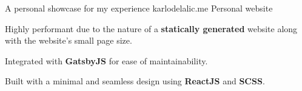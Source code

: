 \begin{cventries}

\cventry
{A personal showcase for my experience} %
{karlodelalic.me \href{https://github.com/kdelalic/karlodelalic.com-gatsby}{\faGithub}} %
{Personal website}
{}
{ %
\begin{cvitems}
\item {Highly performant due to the nature of a \textbf{statically generated} website along with the website's small page size.}
\item {Integrated with \textbf{GatsbyJS} for ease of maintainability.}
\item {Built with a minimal and seamless design using \textbf{ReactJS} and \textbf{SCSS}.}
\end{cvitems}
}


\end{cventries}